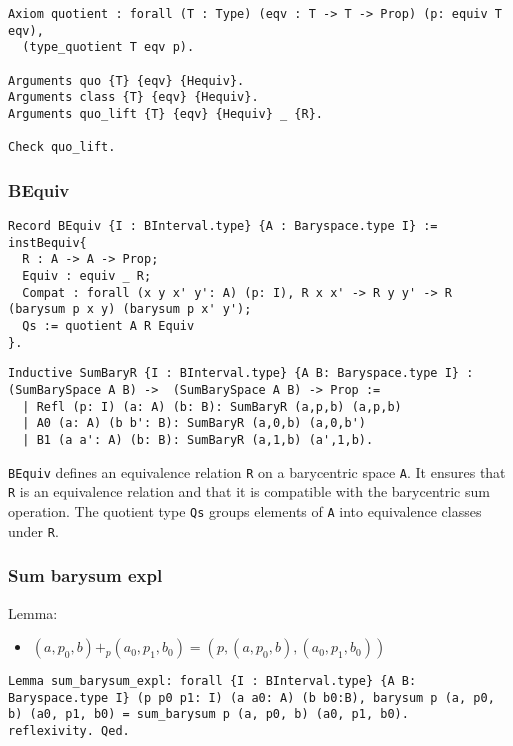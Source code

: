 \documentclass[a4paper,10pt]{article} %
\begin{document}
\begin{lstlisting}
Axiom quotient : forall (T : Type) (eqv : T -> T -> Prop) (p: equiv T eqv), 
  (type_quotient T eqv p).

Arguments quo {T} {eqv} {Hequiv}.
Arguments class {T} {eqv} {Hequiv}.
Arguments quo_lift {T} {eqv} {Hequiv} _ {R}.

Check quo_lift.
\end{lstlisting}

\subsubsection{BEquiv}
\begin{lstlisting}
Record BEquiv {I : BInterval.type} {A : Baryspace.type I} := instBequiv{
  R : A -> A -> Prop;
  Equiv : equiv _ R;
  Compat : forall (x y x' y': A) (p: I), R x x' -> R y y' -> R (barysum p x y) (barysum p x' y');
  Qs := quotient A R Equiv
}.
\end{lstlisting}



\begin{lstlisting}
Inductive SumBaryR {I : BInterval.type} {A B: Baryspace.type I} : (SumBarySpace A B) ->  (SumBarySpace A B) -> Prop := 
  | Refl (p: I) (a: A) (b: B): SumBaryR (a,p,b) (a,p,b)
  | A0 (a: A) (b b': B): SumBaryR (a,0,b) (a,0,b')
  | B1 (a a': A) (b: B): SumBaryR (a,1,b) (a',1,b).
\end{lstlisting}

\texttt{BEquiv} defines an equivalence relation \texttt{R} on a barycentric space \texttt{A}. It ensures that \texttt{R} is an equivalence relation and that it is compatible with the barycentric sum operation. The quotient type \texttt{Qs} groups elements of \texttt{A} into equivalence classes under \texttt{R}.


\subsubsection{Sum barysum expl}
Lemma:
\begin{itemize}
    \item $(a, p_0, b) + _p(a_0, p_1, b_0) = (p, (a, p_0, b), (a_0, p_1, b_0))$
\end{itemize}
\begin{lstlisting}
Lemma sum_barysum_expl: forall {I : BInterval.type} {A B: Baryspace.type I} (p p0 p1: I) (a a0: A) (b b0:B), barysum p (a, p0, b) (a0, p1, b0) = sum_barysum p (a, p0, b) (a0, p1, b0).
reflexivity. Qed.
\end{lstlisting}
\end{document}
